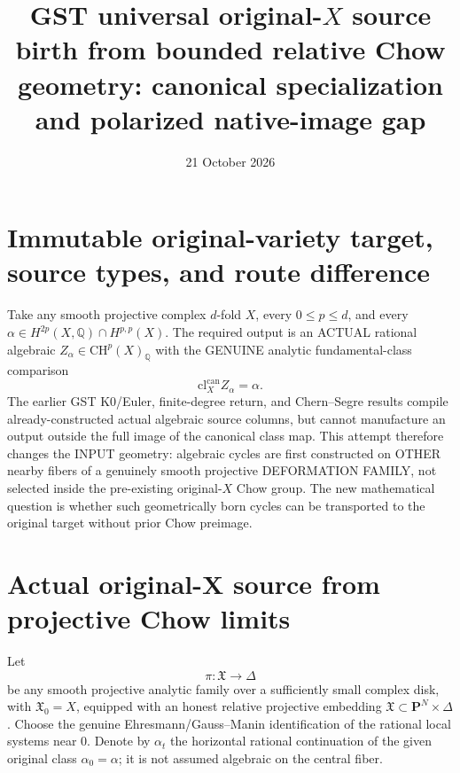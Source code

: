 \documentclass[11pt]{article}
\title{GST universal original-\(X\) source birth from bounded relative Chow geometry:
canonical specialization and polarized native-image gap}
\date{21 October 2026}
\newcommand{\Q}{\mathbb Q}
\newcommand{\CH}{\mathrm{CH}}
\newcommand{\cl}{\mathrm{cl}}
\begin{document}
\maketitle

\section{Immutable original-variety target, source types, and route difference}
Take any smooth projective complex \(d\)-fold \(X\), every
\(0\le p\le d\), and every
\(
\alpha\in H^{2p}(X,\Q)\cap H^{p,p}(X).
\)
The required output is an ACTUAL rational algebraic
\(Z_\alpha\in\CH^p(X)_\Q\) with the GENUINE
analytic fundamental-class comparison
\[
                 \cl_X^{\mathrm{can}} Z_\alpha=\alpha.
                                                               \tag{1}
\]
The earlier GST K0/Euler, finite-degree return, and
Chern--Segre results compile already-constructed actual
algebraic source columns, but cannot manufacture an
output outside the full image of the canonical class map.
This attempt therefore changes the INPUT geometry:
algebraic cycles are first constructed on OTHER
nearby fibers of a genuinely smooth projective
DEFORMATION FAMILY, not selected inside the
pre-existing original-\(X\) Chow group.
The new mathematical question is whether such
geometrically born cycles can be transported to
the original target without prior Chow preimage.

\section{Actual original-X source from projective Chow limits}
Let
\[
 \pi:\mathfrak X\to\Delta
\]
be any smooth projective analytic family over
a sufficiently small complex disk, with
\(\mathfrak X_0=X\), equipped with an honest
relative projective embedding
\(\mathfrak X\subset \mathbf P^N\times\Delta\).
Choose the genuine Ehresmann/Gauss--Manin
identification of the rational local systems
near \(0\). Denote by \(\alpha_t\) the
horizontal rational continuation of the
given original class \(\alpha_0=\alpha\);
it is not assumed algebraic on the central fiber.
\end{document}
